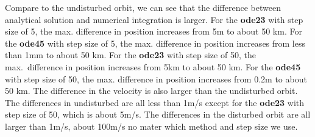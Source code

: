 \documentclass[12pt
,headinclude
,headsepline
,bibtotocnumbered
]{scrartcl}
\begin{document}
    Compare to the undisturbed orbit, we can see that the difference between analytical solution and numerical integration is larger. For the \textbf{ode23} with step size of 5, the max. difference in position increases from 5m to about 50 km. For the \textbf{ode45} with step size of 5, the max. difference in position increases from less than 1mm to about 50 km. For the \textbf{ode23} with step size of 50, the max.\ difference in position increases from 5km to about 50 km. For the \textbf{ode45} with step size of 50, the max. difference in position increases from 0.2m to about 50 km. The difference in the velocity is also larger than the undisturbed orbit. The differences in undisturbed are all less than 1m/s except for the \textbf{ode23} with step size of 50, which is about 5m/s. The differences in the disturbed orbit are all larger than 1m/s, about 100m/s no mater which method and step size we use.
\end{document}
